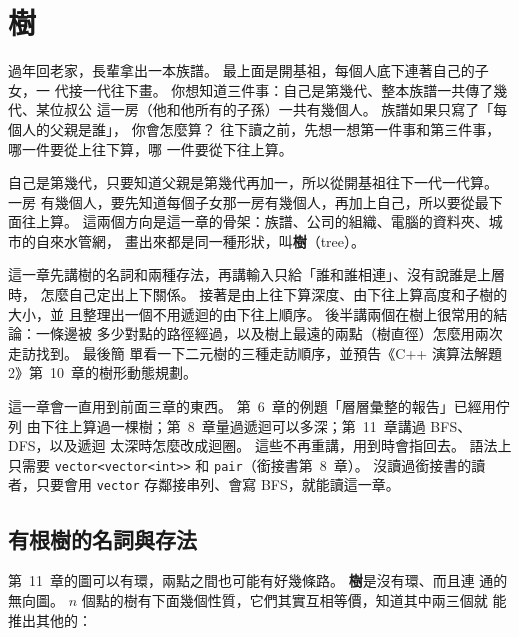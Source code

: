 \chapter{樹}
\label{ch:trees}


過年回老家，長輩拿出一本族譜。 最上面是開基祖，每個人底下連著自己的子女，一
代接一代往下畫。 你想知道三件事：自己是第幾代、整本族譜一共傳了幾代、某位叔公
這一房（他和他所有的子孫）一共有幾個人。 族譜如果只寫了「每個人的父親是誰」，
你會怎麼算？ 往下讀之前，先想一想第一件事和第三件事，哪一件要從上往下算，哪
一件要從下往上算。

自己是第幾代，只要知道父親是第幾代再加一，所以從開基祖往下一代一代算。 一房
有幾個人，要先知道每個子女那一房有幾個人，再加上自己，所以要從最下面往上算。
這兩個方向是這一章的骨架：族譜、公司的組織、電腦的資料夾、城市的自來水管網，
畫出來都是同一種形狀，叫\textbf{樹}（tree）。

這一章先講樹的名詞和兩種存法，再講輸入只給「誰和誰相連」、沒有說誰是上層時，
怎麼自己定出上下關係。 接著是由上往下算深度、由下往上算高度和子樹的大小，並
且整理出一個不用遞迴的由下往上順序。 後半講兩個在樹上很常用的結論：一條邊被
多少對點的路徑經過，以及樹上最遠的兩點（樹直徑）怎麼用兩次走訪找到。 最後簡
單看一下二元樹的三種走訪順序，並預告《C++ 演算法解題 2》第~10~章的樹形動態規劃。

這一章會一直用到前面三章的東西。 第~6~章的例題「層層彙整的報告」已經用佇列
由下往上算過一棵樹；第~8~章量過遞迴可以多深；第~11~章講過 BFS、DFS，以及遞迴
太深時怎麼改成迴圈。 這些不再重講，用到時會指回去。 語法上只需要
\texttt{vector<vector<int>>} 和 \texttt{pair}（銜接書第~8~章）。 沒讀過銜接書的讀
者，只要會用 \texttt{vector} 存鄰接串列、會寫 BFS，就能讀這一章。

\section{有根樹的名詞與存法}
\label{sec:tree-terms}

第~11~章的圖可以有環，兩點之間也可能有好幾條路。 \textbf{樹}是沒有環、而且連
通的無向圖。 $n$ 個點的樹有下面幾個性質，它們其實互相等價，知道其中兩三個就
能推出其他的：

